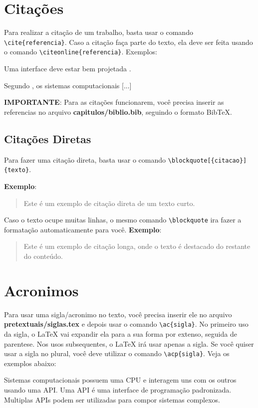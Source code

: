 

\section{Citações}
 
Para realizar a citação de um trabalho, basta usar o comando \verb|\cite{referencia}|. Caso a citação faça parte do texto, ela deve ser feita usando o comando \verb|\citeonline{referencia}|. Exemplos:

Uma interface deve estar bem projetada \cite{autor2023}.

Segundo , os sistemas computacionais [...]

\textbf{IMPORTANTE}: Para as citações funcionarem, você precisa inserir as referencias no arquivo \textbf{capitulos/biblio.bib}, seguindo o formato BibTeX. 

\subsection{Citações Diretas}

Para fazer uma citação direta, basta usar o comando \verb|\blockquote[{citacao}]{texto}|. 

\textbf{Exemplo}: \blockquote[{\cite{fulano2024}}]{Este é um exemplo de citação direta de um texto curto.} 

Caso o texto ocupe muitas linhas, o mesmo comando \verb|\blockquote| ira fazer a formatação automaticamente para você. \textbf{Exemplo}:

\blockquote[{\cite{fulano2024}}]{Este é um exemplo de citação longa, onde o texto é destacado do restante do conteúdo. \lipsum[1]}

\section{Acronimos}

Para usar uma sigla/acronimo no texto, você precisa inserir ele no arquivo \textbf{pretextuais/siglas.tex} e depois usar o comando \verb|\ac{sigla}|. No primeiro uso da sigla, o LaTeX vai expandir ela para a sua forma por extenso, seguida de parentese. Nos usos subsequentes, o LaTeX irá usar apenas a sigla. Se você quiser usar a sigla no plural, você deve utilizar o comando \verb|\acp{sigla}|. Veja os exemplos abaixo:

Sistemas computacionais possuem uma \ac{CPU} e interagem uns com os outros usando uma \ac{API}. Uma \ac{API} é uma interface de programação padronizada. Multiplas \acp{API} podem ser utilizadas para compor sistemas complexos.

